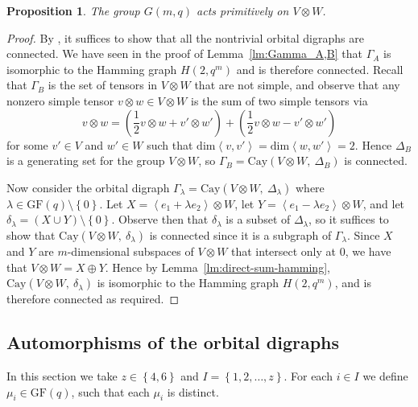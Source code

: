 \documentclass[10pt]{amsart}
\theoremstyle{definition}
\theoremstyle{plain}
\theoremstyle{plain}
\newtheorem{prop}[prop]{Proposition}
\theoremstyle{plain}
\theoremstyle{plain}
\newcommand{\Cay}{\mathrm{Cay}}
\newcommand{\GF}{\mathrm{GF}}
\begin{document}
\begin{prop} \label{prop:primitive}
The group $G{\left(m, q \right)}$ acts primitively on $V \otimes W$.
\end{prop}
\begin{proof}
By \cite[1.12]{ref:higman-intersection}, it suffices to show that all the nontrivial orbital digraphs are connected. We have seen in the proof of Lemma~\ref{lm:Gamma_A,B} that $\Gamma_A$ is isomorphic to the Hamming graph $H{\left(2, q^m \right)}$ and is therefore connected. Recall that $\Gamma_B$ is the set of tensors in $V \otimes W$ that are not simple, and observe that any nonzero simple tensor $v \otimes w \in V \otimes W$ is the sum of two simple tensors via
\begin{displaymath}
v \otimes w = \left(\frac{1}{2} v \otimes w + v' \otimes w' \right) + \left(\frac{1}{2} v \otimes w - v' \otimes w' \right)
\end{displaymath}
for some $v' \in V$ and $w' \in W$ such that $\mathrm{dim} \left<v, v' \right> = \mathrm{dim} \left<w, w' \right> = 2$. Hence $\Delta_B$ is a generating set for the group $V \otimes W$, so $\Gamma_B = \Cay{\left(V \otimes W,\ \Delta_B \right)}$ is connected.

Now consider the orbital digraph $\Gamma_\lambda = \Cay{\left(V \otimes W,\ \Delta_\lambda \right)}$ where $\lambda \in \GF{\left(q \right)} \setminus \left\{0 \right\}$. Let $X = \left<e_1 + \lambda e_2 \right> \otimes W$, let $Y = \left<e_1 - \lambda e_2 \right> \otimes W$, and let $\delta_\lambda = \left(X \cup Y \right) \setminus \left\{0 \right\}$. Observe then that $\delta_\lambda$ is a subset of $\Delta_\lambda$, so it suffices to show that $\Cay{\left(V \otimes W,\ \delta_\lambda \right)}$ is connected since it is a subgraph of $\Gamma_\lambda$. Since $X$ and $Y$ are $m$-dimensional subspaces of $V \otimes W$ that intersect only at $0$, we have that $V \otimes W = X \oplus Y$. Hence by Lemma~\ref{lm:direct-sum-hamming}, $\Cay{\left(V \otimes W,\ \delta_\lambda \right)}$ is isomorphic to the Hamming graph $H{\left(2, q^m \right)}$, and is therefore connected as required.
\end{proof}

\subsection{Automorphisms of the orbital digraphs}
In this section we take $z \in \left\{4, 6 \right\}$ and $I = \left\{1, 2, \ldots, z \right\}$. For each $i \in I$ we define $\mu_i \in \GF{\left(q \right)}$, such that each $\mu_i$ is distinct.
\end{document}
